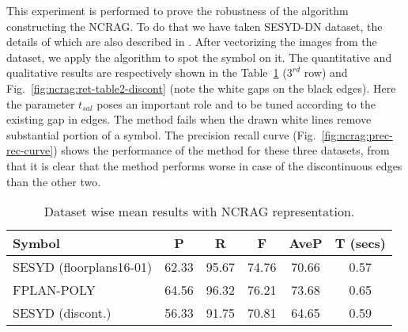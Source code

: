 This experiment is performed to prove the robustness of the algorithm constructing the NCRAG. To do that we have taken SESYD-DN dataset, the details of which are also described in . After vectorizing the images from the dataset, we apply the algorithm to spot the symbol on it. The quantitative and qualitative results are respectively shown in the Table~\ref{table:ncrag:results} ($3^{rd}$ row) and Fig.~\ref{fig:ncrag:ret-table2-discont} (note the white gaps on the black edges). Here the parameter $t_{sal}$ poses an important role and to be tuned according to the existing gap in edges. The method fails when the drawn white lines remove substantial portion of a symbol. The precision recall curve (Fig.~\ref{fig:ncrag:prec-rec-curve}) shows the performance of the method for these three datasets, from that it is clear that the method performs worse in case of the discontinuous edges than the other two.
\begin{table}[h!]
\caption{Dataset wise mean results with NCRAG representation.}
\centering
\begin{tabular}{lccccc}
\toprule
\hline
\textbf{Symbol} & \textbf{P} & \textbf{R} & \textbf{F} & \textbf{AveP} & \textbf{T (secs)}\\
\hline
SESYD (floorplans16-01) & 62.33 & 95.67 & 74.76 & 70.66 & 0.57\\
FPLAN-POLY 	& 64.56 & 96.32 & 76.21 & 73.68 & 0.65\\
SESYD (discont.)	& 56.33 & 91.75 & 70.81 & 64.65 & 0.59\\
\hline
\end{tabular}
\label{table:ncrag:results}
\end{table}

